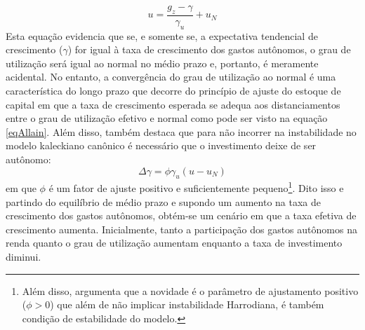 \begin{equation}
\label{u_Allain}
u = \frac{g_z - \gamma}{\gamma_u} + u_N
\end{equation}
Esta equação evidencia que se, e somente se, a expectativa tendencial de crescimento ($\gamma$) for igual à taxa de crescimento dos gastos autônomos, o grau de utilização será igual ao normal no médio prazo e, portanto, é meramente acidental. No entanto, a convergência do grau de utilização ao normal é uma característica do longo prazo que decorre do princípio de ajuste do estoque de capital em que a taxa de crescimento esperada se adequa aos distanciamentos entre o grau de utilização efetivo e normal como pode ser visto na equação \ref{eqAllain}.
Além disso, \textcite{allain_tackling_2015} também destaca que para não incorrer na instabilidade no modelo kaleckiano canônico é necessário que o investimento deixe de ser autônomo: 
\begin{equation}
\label{eqAllain}
\Delta \gamma = \phi\gamma_u(u - u_N)
\end{equation}
em que $\phi$ é um fator de ajuste positivo e suficientemente pequeno\footnote{
	Além disso, \textcite[p.~14]{allain_tackling_2015} argumenta que a novidade  é o parâmetro  de ajustamento positivo ($\phi > 0$) que além de não implicar instabilidade Harrodiana, é também condição de estabilidade do modelo.
}.
Dito isso e partindo do equilíbrio de médio prazo e supondo um aumento na taxa de crescimento dos gastos autônomos, obtém-se um cenário em que a taxa efetiva de crescimento aumenta. 
Inicialmente, tanto a participação dos gastos autônomos na renda quanto o grau de utilização aumentam enquanto a taxa de investimento diminui.

